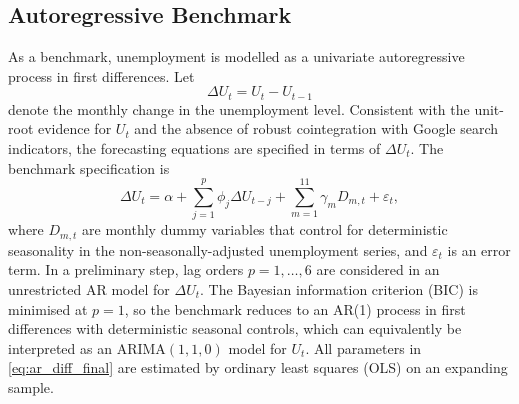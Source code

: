 \documentclass[12pt,a4paper]{article}
\begin{document}
\subsection{Autoregressive Benchmark}
As a benchmark, unemployment is modelled as a univariate autoregressive process in first differences. Let
\[
\Delta U_t = U_t - U_{t-1}
\]
denote the monthly change in the unemployment level. Consistent with the unit-root evidence for $U_t$ and the absence of robust cointegration with Google search indicators, the forecasting equations are specified in terms of $\Delta U_t$.
The benchmark specification is
\begin{equation}
\Delta U_t = \alpha + \sum_{j=1}^{p} \phi_j \Delta U_{t-j} + \sum_{m=1}^{11} \gamma_m D_{m,t} + \varepsilon_t,
\label{eq:ar_diff_final}
\end{equation}
where $D_{m,t}$ are monthly dummy variables that control for deterministic seasonality in the non-seasonally-adjusted unemployment series, and $\varepsilon_t$ is an error term. In a preliminary step, lag orders $p = 1,\dots,6$ are considered in an unrestricted AR model for $\Delta U_t$. The Bayesian information criterion (BIC) is minimised at $p=1$, so the benchmark reduces to an AR(1) process in first differences with deterministic seasonal controls, which can equivalently be interpreted as an ARIMA$(1,1,0)$ model for $U_t$.
All parameters in \eqref{eq:ar_diff_final} are estimated by ordinary least squares (OLS) on an expanding sample. 
\end{document}
